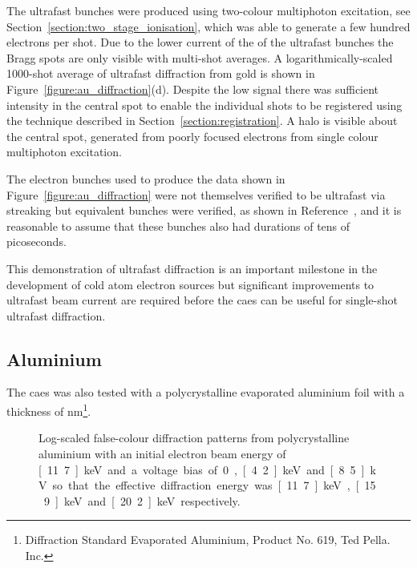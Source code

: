 The ultrafast bunches were produced using two-colour multiphoton excitation, see Section~\ref{section:two_stage_ionisation}, which was able to generate a few hundred electrons per shot.
Due to the lower current of the of the ultrafast bunches the Bragg spots are only visible with multi-shot averages.
A logarithmically-scaled 1000-shot average of ultrafast diffraction from gold is shown in Figure~\ref{figure:au_diffraction}(d).
Despite the low signal there was sufficient intensity in the central spot to enable the individual shots to be registered using the technique described in Section~\ref{section:registration}.
A halo is visible about the central spot, generated from poorly focused electrons from single colour multiphoton excitation.

The electron bunches used to produce the data shown in Figure~\ref{figure:au_diffraction} were not themselves verified to be ultrafast via streaking but equivalent bunches were verified, as shown in Reference~\cite{speirs_identification_2017}, and it is reasonable to assume that these bunches also had durations of tens of picoseconds.

This demonstration of ultrafast diffraction is an important milestone in the development of cold atom electron sources but significant improvements to ultrafast beam current are required before the \gls{caes} can be useful for single-shot ultrafast diffraction.

\subsection{Aluminium}\label{section:aluminium_diffraction}

The \gls{caes} was also tested with a polycrystalline evaporated aluminium foil with a thickness of \unit[31]{nm}\footnote{Diffraction Standard Evaporated Aluminium, Product No. 619, Ted Pella. Inc.}.

\begin{figure}
    \center
    
    \caption[Diffraction patterns from aluminium.]{Log-scaled false-colour diffraction patterns from polycrystalline aluminium with an initial electron beam energy of \unit[11.7]{keV} and a voltage bias of 0, \unit[4.2]{keV} and \unit[8.5]{kV} so that the effective diffraction energy was \unit[11.7]{keV}, \unit[15.9]{keV} and \unit[20.2]{keV} respectively.}
    \label{figure:al_diffraction}
\end{figure}

